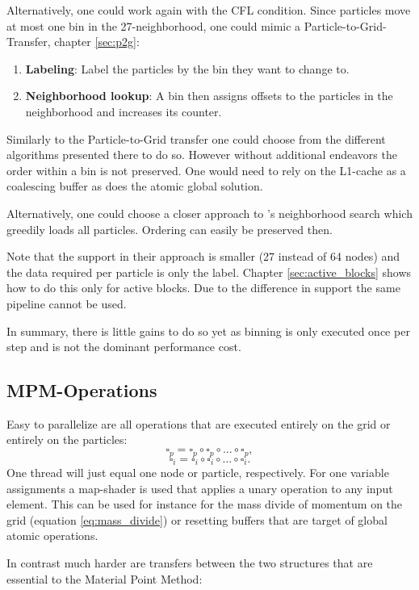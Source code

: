 \documentclass[m,times]{cgMA}
\begin{document}
Alternatively, one could work again with the CFL condition. Since particles move at most one bin in the 27-neighborhood, one could mimic a Particle-to-Grid-Transfer, chapter \ref{sec:p2g}:
\begin{enumerate}
  \item \textbf{Labeling}: Label the particles by the bin they want to change to.
  \item \textbf{Neighborhood lookup}: A bin then assigns offsets to the particles in the neighborhood and increases its counter.
\end{enumerate}
Similarly to the Particle-to-Grid transfer one could choose from the different algorithms presented there to do so. However without additional endeavors the order within a bin is not preserved. One would need to rely on the L1-cache as a coalescing buffer as does the atomic global solution.

Alternatively, one could choose a closer approach to \cite{NVIDIA:NNSEARCH}'s neighborhood search which greedily loads all particles. Ordering can easily be preserved then.

Note that the support in their approach is smaller (27 instead of 64 nodes) and the data required per particle is only the label. Chapter \ref{sec:active_blocks} shows how to do this only for active blocks. Due to the difference in support the same pipeline cannot be used.

In summary, there is little gains to do so yet as binning is only executed once per step and is not the dominant performance cost.

\subsection{MPM-Operations}\label{sec:transfers}
Easy to parallelize are all operations that are executed entirely on the grid or entirely on the particles:
$$\square_p = \square_p \circ \square_p \circ ... \circ \square_p,$$
$$\square_i = \square_i \circ \square_i \circ ... \circ \square_i.$$
One thread will just equal one node or particle, respectively. For one variable assignments a map-shader is used that applies a unary operation to any input element. This can be used for instance for the mass divide of momentum on the grid (equation \ref{eq:mass_divide}) or resetting buffers that are target of global atomic operations.

In contrast much harder are transfers between the two structures that are essential to the Material Point Method:
\end{document}
